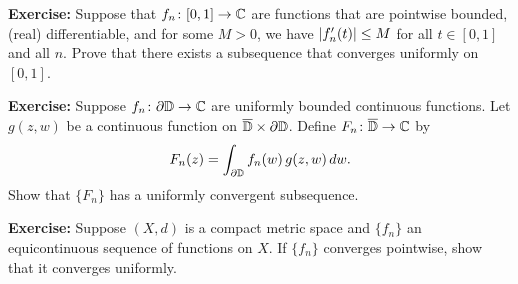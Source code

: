 \documentclass[10pt,aspectratio=169]{beamer}
\begin{document}
\begin{frame}
\textbf{Exercise:}
Suppose that $f_n \colon [0,1] \to {\mathbb{C}}$ are functions that are pointwise
bounded, (real) differentiable, and for some $M> 0$, we have
$\lvert {f_n'(t)} \rvert \leq M$ for all $t \in [0,1]$ and all $n$.  Prove that there
exists a subsequence that converges uniformly on $[0,1]$.

\pause
\medskip

\textbf{Exercise:}
Suppose 
$f_n \colon \partial {\mathbb{D}} \to {\mathbb{C}}$ are uniformly bounded continuous functions.
Let $g(z,w)$ be a continuous function on $\overline{{\mathbb{D}}} \times \partial {\mathbb{D}}$.
Define
$F_n \colon \overline{{\mathbb{D}}} \to {\mathbb{C}}$ by
\begin{equation*}
F_n(z)  = \int_{\partial {\mathbb{D}}} f_n(w)\, g(z,w) \, dw . 
\end{equation*}
Show that $\{ F_n \}$ has a uniformly convergent subsequence.

\pause
\medskip

\textbf{Exercise:}
Suppose $(X,d)$ is a compact metric space and $\{ f_n \}$ an equicontinuous
sequence of functions on $X$.  If $\{ f_n \}$ converges
pointwise, show that it converges uniformly.


\end{frame}
\end{document}
